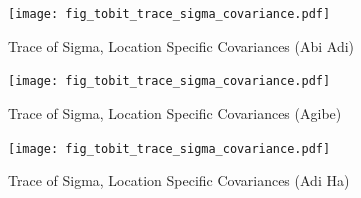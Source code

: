 \documentclass[12pt]{article}
\begin{document}
\begin{figure}[htbp]
\caption{Trace of Sigma, Location Specific Covariances (Abi Adi) }
\begin{center}
\texttt{[image: fig\_tobit\_trace\_sigma\_covariance.pdf]}     
\end{center}
\end{figure}

\begin{figure}[htbp]
\caption{Trace of Sigma, Location Specific Covariances (Agibe) }
\begin{center}
\texttt{[image: fig\_tobit\_trace\_sigma\_covariance.pdf]}     
\end{center}
\end{figure}


\begin{figure}[htbp]
\caption{Trace of Sigma, Location Specific Covariances (Adi Ha) }
\begin{center}
\texttt{[image: fig\_tobit\_trace\_sigma\_covariance.pdf]}     
\end{center}
\end{figure}
\end{document}
